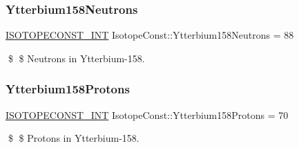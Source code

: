 \subsubsection{\texorpdfstring{Ytterbium158\+Neutrons}{Ytterbium158Neutrons}}
{\footnotesize\ttfamily \mbox{\hyperlink{group___isotope_const-_macros_ga5f18360b3e99483a35c32d789e62621c}{I\+S\+O\+T\+O\+P\+E\+C\+O\+N\+S\+T\+\_\+\+I\+NT}} Isotope\+Const\+::\+Ytterbium158\+Neutrons = 88}

\$ \$ Neutrons in Ytterbium-\/158. \mbox{\label{group___isotope_const-_ytterbium-_yb158_gab626319923edf85a7321aa6da5a78130}} 
\subsubsection{\texorpdfstring{Ytterbium158\+Protons}{Ytterbium158Protons}}
{\footnotesize\ttfamily \mbox{\hyperlink{group___isotope_const-_macros_ga5f18360b3e99483a35c32d789e62621c}{I\+S\+O\+T\+O\+P\+E\+C\+O\+N\+S\+T\+\_\+\+I\+NT}} Isotope\+Const\+::\+Ytterbium158\+Protons = 70}

\$ \$ Protons in Ytterbium-\/158. 